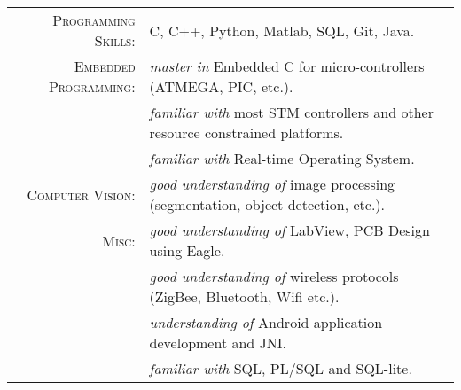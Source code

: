 %
%


 
\renewcommand{\arraystretch}{1.1}

	\begin{tabular}{>{}r>{}p{13cm}} 
		\textsc{Programming Skills:}    &  C, C++, Python, Matlab, SQL, Git, Java.\\  
		\textsc{Embedded Programming:} 		&  \emph{master in} Embedded C for micro-controllers (ATMEGA, PIC, etc.).\\
										&  \emph{familiar with} most  STM controllers and other resource constrained platforms.\\
										&  \emph{familiar with} Real-time Operating System.\\
		\textsc{Computer Vision:}		&   \emph{good understanding of} image processing (segmentation, object detection, etc.). \\
		\textsc{Misc:}	&	\emph{good understanding of} LabView, PCB Design using Eagle.\\
						&	\emph{good understanding of} wireless protocols (ZigBee, Bluetooth, Wifi etc.).\\
						&	\emph{understanding of}  Android application development and JNI.\\
						&	\emph{familiar with} SQL, PL/SQL and SQL-lite.\\
	\end{tabular}
